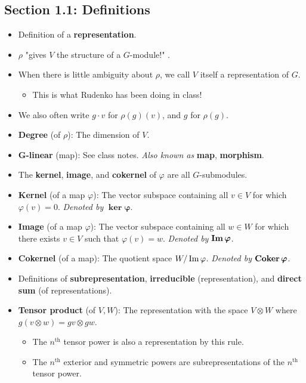 \documentclass[../notes.tex]{subfiles}
\begin{document}
\subsection*{Section 1.1: Definitions}
\begin{itemize}
    \item Definition of a \textbf{representation}.
    \item $\rho$ "gives $V$ the structure of a $G$-module!" \parencite[3]{bib:FultonHarris}.
    \item When there is little ambiguity about $\rho$, we call $V$ itself a representation of $G$.
    \begin{itemize}
        \item This is what Rudenko has been doing in class!
    \end{itemize}
    \item We also often write $g\cdot v$ for $\rho(g)(v)$, and $g$ for $\rho(g)$.
    \item \textbf{Degree} (of $\rho$): The dimension of $V$.
    \item \textbf{$\bm{G}$-linear} (map): See class notes. \emph{Also known as} \textbf{map}, \textbf{morphism}.
    \item The \textbf{kernel}, \textbf{image}, and \textbf{cokernel} of $\varphi$ are all $G$-submodules.
    \item \textbf{Kernel} (of a map $\varphi$): The vector subspace containing all $v\in V$ for which $\varphi(v)=0$. \emph{Denoted by} $\bm{\ker\varphi}$.
    \item \textbf{Image} (of a map $\varphi$): The vector subspace containing all $w\in W$ for which there exists $v\in V$ such that $\varphi(v)=w$. \emph{Denoted by} $\bm{\im\varphi}$.
    \item \textbf{Cokernel} (of a map): The quotient space $W/\operatorname{Im}\varphi$. \emph{Denoted by} $\bm{\coker\varphi}$.
    \item Definitions of \textbf{subrepresentation}, \textbf{irreducible} (representation), and \textbf{direct sum} (of representations).
    \item \textbf{Tensor product} (of $V,W$): The representation with the space $V\otimes W$ where $g(v\otimes w)=gv\otimes gw$.
    \begin{itemize}
        \item {}The $n^\text{th}$ tensor power is also a representation by this rule.
        \item The $n^\text{th}$ exterior and symmetric powers are subrepresentations of the $n^\text{th}$ tensor power.

\end{itemize}
\end{itemize}
\end{document}
